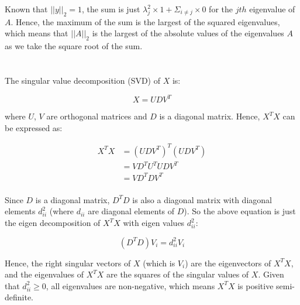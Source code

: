 \documentclass[12pt]{article}
\begin{document}
\noindent Known that $||y||_2=1$, the sum is just $\lambda_j^2\times 1+\Sigma_{i\neq j}\times 0$ for the $jth$ eigenvalue of $A$. Hence, the maximum of the sum is the largest of the squared eigenvalues, which means that $||A||_2$ is the largest of the absolute values of the eigenvalues $A$ as we take the square root of the sum.

\section{}

\subsection{}

The singular value decomposition (SVD) of $X$ is:

\begin{equation*}
X=UDV^T
\end{equation*}

\noindent where $U$, $V$ are orthogonal matrices and $D$ is a diagonal matrix. Hence, $X^TX$ can be expressed as:

\begin{equation*}
\begin{split}
X^TX&=(UDV^T)^T(UDV^T)\\
&=VD^TU^TUDV^T\\
&=VD^TDV^T\\
\end{split}
\end{equation*}

\noindent Since $D$ is a diagonal matrix, $D^TD$ is also a diagonal matrix with diagonal elements $d_{ii}^2$ (where $d_{ii}$ are diagonal elements of $D$). So the above equation is just the eigen decomposition of $X^TX$ with eigen values $d_{ii}^2$:

\begin{equation*}
(D^TD)V_i=d_{ii}^2V_i
\end{equation*}

\noindent Hence, the right singular vectors of $X$ (which is $V_{i}$) are the eigenvectors of $X^TX$, and the eigenvalues of $X^TX$  are the squares of the singular values of $X$. Given that $d_{ii}^2\ge 0$, all eigenvalues are non-negative, which means $X^TX$ is positive semi-definite.

\subsection{} 
\end{document}
